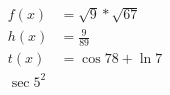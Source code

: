 \documentclass{article}
\begin{document}
	\begin{align*}
		f(x) &= \sqrt{9} * \sqrt{67}\\
		h(x) &= \frac{9}{89}\\
		t(x) &= \cos 78 + \ln 7\\
		\sec 5^{2}
	\end{align*}
\end{document}

